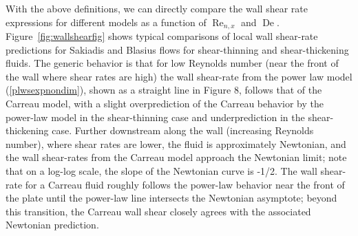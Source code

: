 \documentclass{article}
\begin{document}
With the above definitions, we can directly compare the wall shear rate expressions for different models as a function of $\operatorname{Re}_{n, x}$ and $\operatorname{De}$. Figure~\ref{fig:wallshearfig} shows typical comparisons of local wall shear-rate predictions for Sakiadis and Blasius flows for shear-thinning and shear-thickening fluids. The generic behavior is that for low Reynolds number (near the front of the wall where shear rates are high) the wall shear-rate from the power law model (\ref{plwsexpnondim}), shown as a straight line in Figure 8, follows that of the Carreau model, with a slight overprediction of the Carreau behavior by the power-law model in the shear-thinning case and underprediction in the shear-thickening case. Further downstream along the wall (increasing Reynolds number), where shear rates are lower, the fluid is approximately Newtonian, and the wall shear-rates from the Carreau model approach the Newtonian limit; note that on a log-log scale, the slope of the  Newtonian curve is -1/2. The wall shear-rate for a Carreau fluid roughly follows the power-law behavior near the front of the plate until the power-law line intersects the Newtonian asymptote; beyond this transition, the Carreau wall shear closely agrees with the associated Newtonian prediction.
\end{document}
